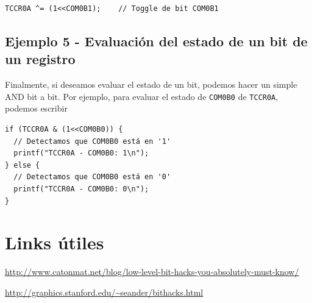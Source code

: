 \documentclass[paper=a4, fontsize=11pt]{scrartcl}	%
\numberwithin{equation}{section} %
\numberwithin{figure}{section} %
\numberwithin{table}{section} %
\begin{document}
\begin{verbatim}
TCCR0A ^= (1<<COM0B1);    // Toggle de bit COM0B1
\end{verbatim}

\subsection{Ejemplo 5 - Evaluación del estado de un bit de un registro}

Finalmente, si deseamos evaluar el estado de un bit, podemos
hacer un simple AND {bit a bit}. Por ejemplo, para evaluar el
estado de \verb|COM0B0| de \verb|TCCR0A|, podemos escribir

\begin{verbatim}
if (TCCR0A & (1<<COM0B0)) {
  // Detectamos que COM0B0 está en '1'
  printf("TCCR0A - COM0B0: 1\n");
} else {
  // Detectamos que COM0B0 está en '0'
  printf("TCCR0A - COM0B0: 0\n");
}
\end{verbatim}

\section{Links útiles}

{
  \footnotesize
\url{http://www.catonmat.net/blog/low-level-bit-hacks-you-absolutely-must-know/}

\url{http://graphics.stanford.edu/~seander/bithacks.html}
}
\end{document}
